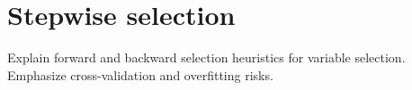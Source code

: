 \section{Stepwise selection}

Explain forward and backward selection heuristics for variable selection. Emphasize cross-validation and overfitting risks.
